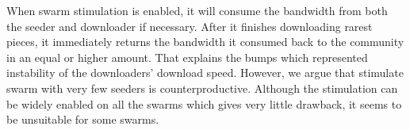 When swarm stimulation is enabled, it will consume the bandwidth from both the seeder and downloader if necessary. After it finishes downloading rarest pieces, it immediately returns the bandwidth it consumed back to the community in an equal or higher amount. That explains the bumps which represented instability of the downloaders' download speed. However, we argue that stimulate swarm with very few seeders is counterproductive. Although the stimulation can be widely enabled on all the swarms which gives very little drawback, it seems to be unsuitable for some swarms. 

